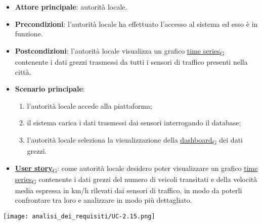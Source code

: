 \begin{itemize}
	\item \textbf{Attore principale}: autorità locale.
	\item \textbf{Precondizioni}: l'autorità locale ha effettuato l'accesso al sistema ed esso è in funzione.
	\item \textbf{Postcondizioni}: l'autorità locale visualizza un grafico \href{https://7last.github.io/docs/pb/documentazione-interna/glossario\#time-series}{time series\textsubscript{G}} contenente i dati grezzi trasmessi da tutti i sensori
	      di traffico presenti nella città.
	\item \textbf{Scenario principale}:
	      \begin{enumerate}
		      \item l'autorità locale accede alla piattaforma;
		      \item il sistema carica i dati trasmessi dai sensori interrogando il database;
		      \item l'autorità locale seleziona la visualizzazione della \href{https://7last.github.io/docs/pb/documentazione-interna/glossario\#dashboard}{dashboard\textsubscript{G}} dei dati grezzi.
	      \end{enumerate}
	\item \href{https://7last.github.io/docs/pb/documentazione-interna/glossario\#user-story}{\textbf{User story}\textsubscript{G}}:
	      come autorità locale desidero poter visualizzare un grafico \href{https://7last.github.io/docs/pb/documentazione-interna/glossario\#time-series}{time series\textsubscript{G}} contenente i dati grezzi del numero di veicoli transitati e della velocità media espressa in km/h
	      rilevati dai sensori di traffico, in modo da poterli confrontare tra loro e analizzare in modo più dettagliato.
\end{itemize}
\begin{center}
	\texttt{[image: analisi\_dei\_requisiti/UC-2.15.png]}
\end{center}



